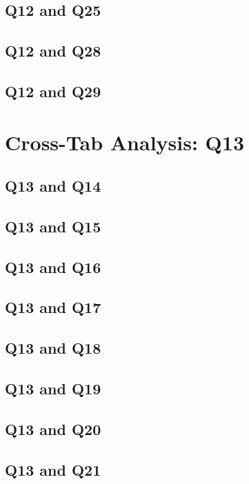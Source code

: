 \documentclass{report}
\begin{document}
\section{Q12 and Q25}\clearpage
\section{Q12 and Q28}\clearpage
\section{Q12 and Q29}\clearpage

\chapter{Cross-Tab Analysis: Q13}

\section{Q13 and Q14}\clearpage
\section{Q13 and Q15}\clearpage
\section{Q13 and Q16}\clearpage
\section{Q13 and Q17}\clearpage
\section{Q13 and Q18}\clearpage
\section{Q13 and Q19}\clearpage
\section{Q13 and Q20}\clearpage
\section{Q13 and Q21}\clearpage
\end{document}
